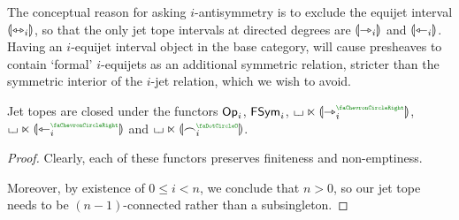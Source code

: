 \documentclass[a4paper]{memoir}
\begin{document}
The conceptual reason for asking $i$-antisymmetry is to exclude the equijet interval ${\llparenthesis {\leftrightarrowtriangle}_i \rrparenthesis}$, so that the only jet tope intervals at directed degrees are ${\llparenthesis {\rightarrowtriangle}_i \rrparenthesis}$ and ${\llparenthesis {\leftarrowtriangle}_i \rrparenthesis}$.
Having an $i$-equijet interval object in the base category, will cause presheaves to contain `formal' $i$-equijets as an additional symmetric relation, stricter than the symmetric interior of the $i$-jet relation, which we wish to avoid.
\begin{proposition} \label{thm:lift-to-jet-topes}
	Jet topes are closed under the functors ${\mathsf{Op}}_i$, $\mathsf{FSym}_i$,
	$\loch \multip \rival{\jet_i\pmry}$, $\loch \multip \rival{\tej_i\pmry}$ and $\loch \multip \rival{\edge_i\pmrn}$.
\end{proposition}
\begin{proof}
	Clearly, each of these functors preserves finiteness and non-emptiness.
	
	Moreover, by existence of $0 \leq i < n$, we conclude that $n > 0$, so our jet tope needs to be $(n-1)$-connected rather than a subsingleton.
	

\end{proof}
\end{document}
